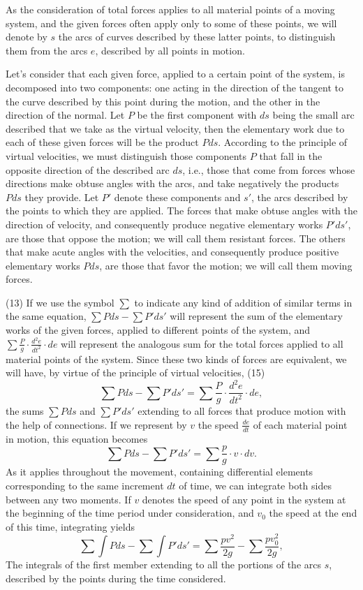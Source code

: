 \documentclass{book}
\begin{document}
As the consideration of total forces applies to all material points of a moving system, and the given forces often apply only to some of these points, we will denote by \( s \) the arcs of curves described by these latter points, to distinguish them from the arcs \( e \), described by all points in motion.

Let's consider that each given force, applied to a certain point of the system, is decomposed into two components: one acting in the direction of the tangent to the curve described by this point during the motion, and the other in the direction of the normal. Let \( P \) be the first component with \( ds \) being the small arc described that we take as the virtual velocity, then the elementary work due to each of these given forces will be the product \( Pds \). According to the principle of virtual velocities, we must distinguish those components \( P \) that fall in the opposite direction of the described arc \( ds \), i.e., those that come from forces whose directions make obtuse angles with the arcs, and take negatively the products \( Pds \) they provide. Let \( P' \) denote these components and \( s' \), the arcs described by the points to which they are applied. The forces that make obtuse angles with the direction of velocity, and consequently produce negative elementary works \( P'ds' \), are those that oppose the motion; we will call them resistant forces. The others that make acute angles with the velocities, and consequently produce positive elementary works \( Pds \), are those that favor the motion; we will call them moving forces.

(13) If we use the symbol \( \sum \) to indicate any kind of addition of similar terms in the same equation, \( \sum Pds - \sum P'ds' \) will represent the sum of the elementary works of the given forces, applied to different points of the system, and \( \sum \frac{P}{g} \cdot \frac{d^2e}{dt^2} \cdot de \) will represent the analogous sum for the total forces applied to all material points of the system. Since these two kinds of forces are equivalent, we will have, by virtue of the principle of virtual velocities, 
\newpage
(15)
\[ \sum Pds - \sum P'ds' = \sum \frac{P}{g} \cdot \frac{d^2e}{dt^2} \cdot de, \]
the sums \( \sum Pds \) and \( \sum P'ds' \) extending to all forces that produce motion with the help of connections.
If we represent by \( v \) the speed \( \frac{de}{dt} \) of each material point in motion, this equation becomes
\[ \sum Pds - \sum P'ds' = \sum \frac{p}{g} \cdot v \cdot dv. \]
As it applies throughout the movement, containing differential elements corresponding to the same increment \( dt \) of time, we can integrate both sides between any two moments. If \( v \) denotes the speed of any point in the system at the beginning of the time period under consideration, and \( v_0 \) the speed at the end of this time, integrating yields
\[ \sum \int Pds - \sum \int P'ds' = \sum \frac{pv^2}{2g} - \sum \frac{pv_0^2}{2g}, \]
The integrals of the first member extending to all the portions of the arcs \( s \), described by the points during the time considered.
\end{document}
